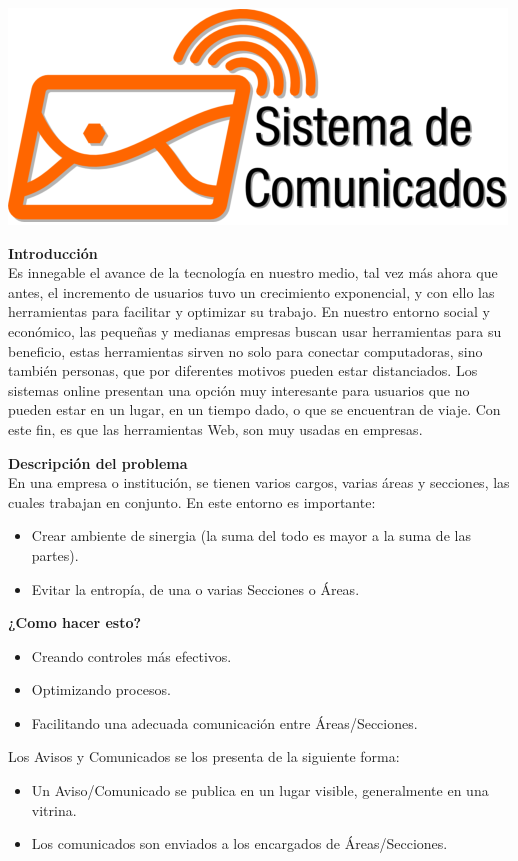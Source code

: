 \documentclass[10pt,letterpaper,twoside]{article}
\newcommand{\btext}[1]{
    \vspace{10mm}
    {{\textcolor{titlecolor}{\large{\textbf{\textsf{#1}}}}}}
    \vspace{5mm}
    \\
}
\begin{document}
\begin{multicols}{2}
\includegraphics[scale=1.0]{img/comunicados.eps}

\btext{Introducción}
Es innegable el avance de la tecnología en nuestro medio, tal vez más ahora que antes, el incremento de usuarios tuvo un crecimiento exponencial, y con ello las herramientas para facilitar y optimizar su trabajo.
En nuestro entorno social y económico, las pequeñas y medianas empresas buscan usar herramientas para su beneficio, estas herramientas sirven no solo para conectar computadoras, sino también personas, que por diferentes motivos pueden estar distanciados.
Los sistemas online presentan una opción muy interesante para usuarios que no pueden estar en un lugar, en un tiempo dado, o que se encuentran de viaje. Con este fin, es que las herramientas Web, son muy usadas en empresas.

\btext{Descripción del problema}
En una empresa o institución, se tienen varios cargos, varias áreas y secciones, las cuales trabajan en conjunto.
En este entorno es importante:
\begin{itemize}
    \item Crear ambiente de sinergia (la suma del todo es mayor a la suma de las partes).
    \item Evitar la entropía, de una o varias Secciones o Áreas.
\end{itemize}

\btext{¿Como hacer esto?}
\begin{itemize}
    \item Creando controles más efectivos.
    \item Optimizando procesos.
    \item Facilitando una adecuada comunicación entre Áreas/Secciones.
\end{itemize}

Los Avisos y Comunicados se los presenta de la siguiente forma:
\begin{itemize}
    \item Un Aviso/Comunicado se publica en un lugar visible, generalmente en una vitrina.
    \item Los comunicados son enviados a los encargados de Áreas/Secciones.
\end{itemize}


\end{multicols}
\end{document}
